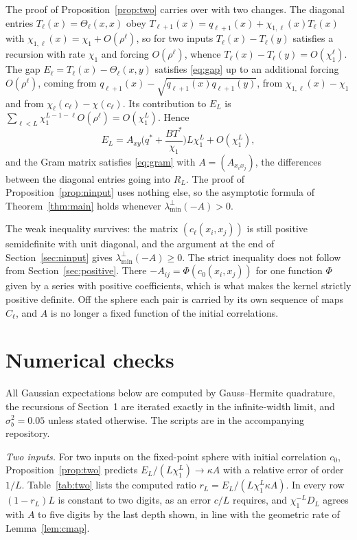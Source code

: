 \documentclass[11pt]{amsart}
\theoremstyle{remark}\newtheorem{remark}[theorem]{Remark}
\begin{document}
The proof of Proposition~\ref{prop:two} carries over with two changes. The diagonal entries $T_\ell(x)=\Theta_\ell(x,x)$
obey $T_{\ell+1}(x)=q_{\ell+1}(x)+\chi_{1,\ell}(x)T_\ell(x)$ with $\chi_{1,\ell}(x)=\chi_1+O(\rho^\ell)$, so for two inputs
$T_\ell(x)-T_\ell(y)$ satisfies a recursion with rate $\chi_1$ and forcing $O(\rho^\ell)$, whence
$T_\ell(x)-T_\ell(y)=O(\chi_1^\ell)$. The gap $E_\ell=T_\ell(x)-\Theta_\ell(x,y)$ satisfies \eqref{eq:gap} up to an
additional forcing $O(\rho^\ell)$, coming from $q_{\ell+1}(x)-\sqrt{q_{\ell+1}(x)q_{\ell+1}(y)}$, from
$\chi_{1,\ell}(x)-\chi_1$ and from $\chi_\ell(c_\ell)-\chi(c_\ell)$. Its contribution to $E_L$ is
$\sum_{\ell<L}\chi_1^{L-1-\ell}O(\rho^\ell)=O(\chi_1^L)$. Hence
\[
E_L=A_{xy}\Big(q^*+\frac{BT^*}{\chi_1}\Big)L\chi_1^L+O(\chi_1^L),
\]
and the Gram matrix satisfies \eqref{eq:gram} with $A=(A_{x_ix_j})$, the differences between the diagonal entries going
into $R_L$. The proof of Proposition~\ref{prop:ninput} uses nothing else, so the asymptotic formula of
Theorem~\ref{thm:main} holds whenever $\lambda_{\min}^\perp(-A)>0$.

The weak inequality survives: the matrix $(c_\ell(x_i,x_j))$ is still positive semidefinite with unit diagonal, and the
argument at the end of Section~\ref{sec:ninput} gives $\lambda_{\min}^\perp(-A)\ge0$. The strict inequality does not
follow from Section~\ref{sec:positive}. There $-A_{ij}=\Phi(c_0(x_i,x_j))$ for one function $\Phi$ given by a series with
positive coefficients, which is what makes the kernel strictly positive definite. Off the sphere each pair is carried by
its own sequence of maps $C_\ell$, and $A$ is no longer a fixed function of the initial correlations.

\section{Numerical checks}\label{sec:numerics}
All Gaussian expectations below are computed by Gauss--Hermite quadrature, the recursions of Section~1 are iterated
exactly in the infinite-width limit, and $\sigma_b^2=0.05$ unless stated otherwise. The scripts are in the
accompanying repository.

\emph{Two inputs.} For two inputs on the fixed-point sphere with initial correlation $c_0$, Proposition~\ref{prop:two}
predicts $E_L/(L\chi_1^L)\to\kappa A$ with a relative error of order $1/L$. Table~\ref{tab:two} lists the computed
ratio $r_L=E_L/(L\chi_1^L\kappa A)$. In every row $(1-r_L)L$ is constant to two digits, as an error $c/L$ requires, and
$\chi_1^{-L}D_L$ agrees with $A$ to five digits by the last depth shown, in line with the geometric rate of
Lemma~\ref{lem:cmap}.
\end{document}
